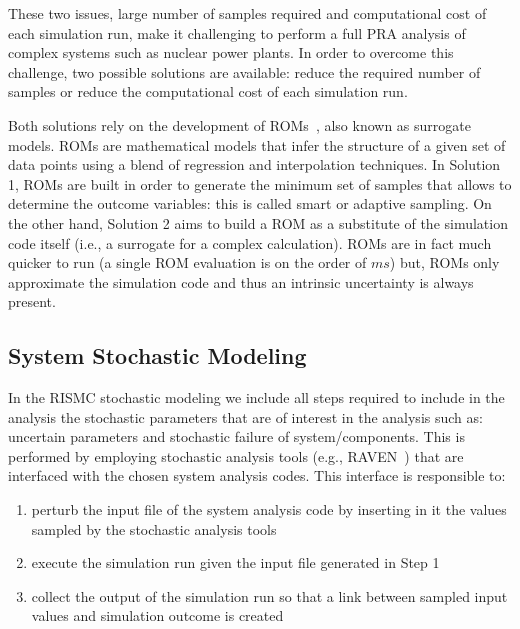 These two issues, large number of samples required and computational cost of each simulation run, 
make it challenging to perform a full PRA analysis of complex systems such as nuclear power plants.  
In order to overcome this challenge, two possible solutions are available: reduce the required 
number of samples or reduce the computational cost of each simulation run.

Both solutions rely on the development of ROMs~\cite{ROM_Khalik}, also known as surrogate models. 
ROMs are mathematical models that infer the structure of a given set of data points using a
blend of regression and interpolation techniques. In Solution 1, ROMs are built in order to generate 
the minimum set of samples that allows to determine the outcome variables: this is called smart or 
adaptive sampling. On the other hand, Solution 2 aims to build a ROM as a substitute of the simulation 
code itself (i.e., a surrogate for a complex calculation).  ROMs are in fact much quicker to run 
(a single ROM evaluation is on the order of $ms$) but, ROMs only approximate the simulation code and 
thus an intrinsic uncertainty is always present.

\subsection{System Stochastic Modeling}
In the RISMC stochastic modeling we include all steps required to include in the analysis the 
stochastic parameters that are of interest in the analysis such as: uncertain parameters and stochastic 
failure of system/components.
This is performed by employing stochastic analysis tools (e.g., RAVEN~\cite{RAVEN_PSAM_2014}) that are 
interfaced with the chosen system analysis codes. This interface is responsible to:

\begin{enumerate}
  \item perturb the input file of the system analysis code by inserting in it the values sampled by the
        stochastic analysis tools
  \item execute the simulation run given the input file generated in Step 1
  \item collect the output of the simulation run so that a link between sampled input values and simulation 
        outcome is created      
\end{enumerate}

